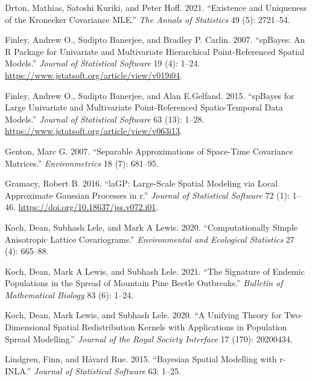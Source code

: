 \begin{CSLReferences}{1}{0}
\leavevmode{}%
Drton, Mathias, Satoshi Kuriki, and Peter Hoff. 2021. {``Existence and Uniqueness of the Kronecker Covariance MLE.''} \emph{The Annals of Statistics} 49 (5): 2721--54.

\leavevmode{}%
Finley, Andrew O., Sudipto Banerjee, and Bradley P. Carlin. 2007. {``{spBayes}: An {R} Package for Univariate and Multivariate Hierarchical Point-Referenced Spatial Models.''} \emph{Journal of Statistical Software} 19 (4): 1--24. \url{https://www.jstatsoft.org/article/view/v019i04}.

\leavevmode{}%
Finley, Andrew O., Sudipto Banerjee, and Alan E.Gelfand. 2015. {``{spBayes} for Large Univariate and Multivariate Point-Referenced Spatio-Temporal Data Models.''} \emph{Journal of Statistical Software} 63 (13): 1--28. \url{https://www.jstatsoft.org/article/view/v063i13}.

\leavevmode{}%
Genton, Marc G. 2007. {``Separable Approximations of Space-Time Covariance Matrices.''} \emph{Environmetrics} 18 (7): 681--95.

\leavevmode{}%
Gramacy, Robert B. 2016. {``laGP: Large-Scale Spatial Modeling via Local Approximate Gaussian Processes in r.''} \emph{Journal of Statistical Software} 72 (1): 1--46. \url{https://doi.org/10.18637/jss.v072.i01}.

\leavevmode{}%
Koch, Dean, Subhash Lele, and Mark A Lewis. 2020. {``Computationally Simple Anisotropic Lattice Covariograms.''} \emph{Environmental and Ecological Statistics} 27 (4): 665--88.

\leavevmode{}%
Koch, Dean, Mark A Lewis, and Subhash Lele. 2021. {``The Signature of Endemic Populations in the Spread of Mountain Pine Beetle Outbreaks.''} \emph{Bulletin of Mathematical Biology} 83 (6): 1--24.

\leavevmode{}%
Koch, Dean, Mark Lewis, and Subhash Lele. 2020. {``A Unifying Theory for Two-Dimensional Spatial Redistribution Kernels with Applications in Population Spread Modelling.''} \emph{Journal of the Royal Society Interface} 17 (170): 20200434.

\leavevmode{}%
Lindgren, Finn, and Håvard Rue. 2015. {``Bayesian Spatial Modelling with r-INLA.''} \emph{Journal of Statistical Software} 63: 1--25.


\end{CSLReferences}
